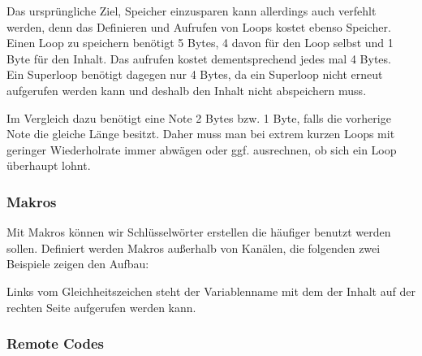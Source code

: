 Das ursprüngliche Ziel, Speicher einzusparen kann allerdings auch verfehlt werden, denn das Definieren und Aufrufen von Loops kostet ebenso Speicher. \\
Einen Loop zu speichern benötigt 5 Bytes, 4 davon für den Loop selbst und 1 Byte für den Inhalt. Das aufrufen kostet dementsprechend jedes mal 4 Bytes.\\
Ein Superloop benötigt dagegen nur 4 Bytes, da ein Superloop nicht erneut aufgerufen werden kann und deshalb den Inhalt nicht abspeichern muss.

Im Vergleich dazu benötigt eine Note 2 Bytes bzw. 1 Byte, falls die vorherige Note die gleiche Länge besitzt. Daher muss man bei extrem kurzen Loops mit geringer Wiederholrate immer abwägen oder ggf. ausrechnen, ob sich ein Loop überhaupt lohnt.

\subsubsection{Makros}

Mit Makros können wir Schlüsselwörter erstellen die häufiger benutzt werden sollen. Definiert werden Makros außerhalb von Kanälen, die folgenden zwei Beispiele zeigen den Aufbau:

\medskip



\medskip

Links vom Gleichheitszeichen steht der Variablenname mit dem der Inhalt auf der rechten Seite aufgerufen werden kann.

\subsubsection{Remote Codes}